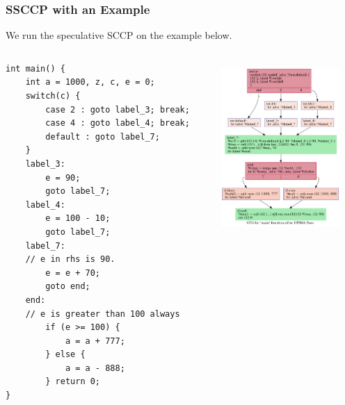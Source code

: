 \documentclass{beamer}
\begin{document}
\begin{frame}[fragile]
	\frametitle{SSCCP with an Example}
We run the speculative SCCP on the example below.
\begin{columns}
	\begin{column}{0.2\textwidth}
\begin{verbatim}
int main() {
	int a = 1000, z, c, e = 0;
	switch(c) {   
		case 2 : goto label_3; break;
		case 4 : goto label_4; break;
		default : goto label_7; 
	}
	label_3:
		e = 90;
		goto label_7;
	label_4:
		e = 100 - 10;
		goto label_7;
	label_7:
	// e in rhs is 90.
		e = e + 70;  
		goto end;
	end:
	// e is greater than 100 always
		if (e >= 100) {  
			a = a + 777;
		} else {
			a = a - 888;
		} return 0; 
}
\end{verbatim}
	\end{column}
	\begin{column}{0.5\textwidth}  
		\begin{center}
			\includegraphics[width=4.5cm,height=6.5cm]{afterHPSSA.dot.png}
		\end{center}
	\end{column}
\end{columns}
\end{frame}
\end{document}
